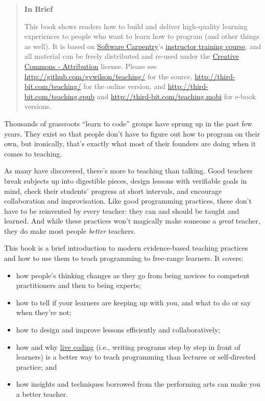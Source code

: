 \documentclass[10pt,statementpaper]{memoir}
\begin{document}
\begin{quote}
\textbf{In Brief}

This book shows readers how to build and deliver high-quality learning
experiences to people who want to learn how to program (and other things
as well). It is based on \href{http://software-carpentry.org}{Software
Carpentry}'s
\href{https://swcarpentry.github.io/instructor-training/}{instructor
training course}, and all material can be freely distributed and re-used
under the \href{/license/}{Creative Commons - Attribution} license.
Please see \url{http://github.com/gvwilson/teaching/} for the source,
\url{http://third-bit.com/teaching/} for the online version, and
\url{http://third-bit.com/teaching.epub} and
\url{http://third-bit.com/teaching.mobi} for e-book versions.
\end{quote}

Thousands of grassroots ``learn to code'' groups have sprung up in the
past few years. They exist so that people don't have to figure out how
to program on their own, but ironically, that's exactly what most of
their founders are doing when it comes to teaching.

As many have discovered, there's more to teaching than talking. Good
teachers break subjects up into digestible pieces, design lessons with
verifiable goals in mind, check their students' progress at short
intervals, and encourage collaboration and improvisation. Like good
programming practices, these don't have to be reinvented by every
teacher: they can and should be taught and learned. And while these
practices won't magically make someone a \emph{great} teacher, they do
make most people \emph{better} teachers.

This book is a brief introduction to modern evidence-based teaching
practices and how to use them to teach programming to free-range
learners. It covers:

\begin{itemize}
\item
  how people's thinking changes as they go from being novices to
  competent practitioners and then to being experts;
\item
  how to tell if your learners are keeping up with you, and what to do
  or say when they're not;
\item
  how to design and improve lessons efficiently and collaboratively;
\item
  how and why \href{live.html}{live coding} (i.e., writing programs step
  by step in front of learners) is a better way to teach programming
  than lectures or self-directed practice; and
\item
  how insights and techniques borrowed from the performing arts can make
  you a better teacher.
\end{itemize}
\end{document}
